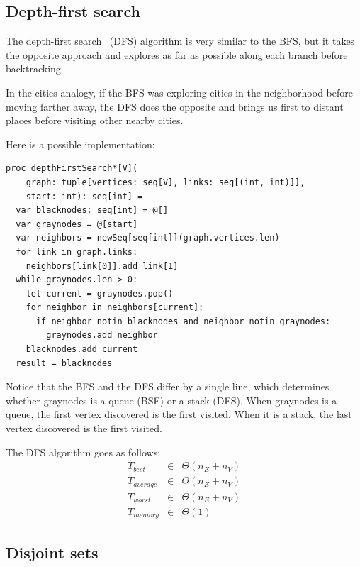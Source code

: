 \documentclass[justified, sixbynine]{tufte-book}
\def\ft{\small\tt}
\theoremstyle{plain}%
\newtheorem * {corollary}{Corollary}
\theoremstyle{definition}
\theoremstyle{remark}
\newtheorem * {remark}{Remark}
\newtheorem * {note}{Note}
\begin{document}
\begin{fullwidth}
\subsection{Depth-first search}


The depth-first search~\cite{dfs} (DFS) algorithm is very similar to the BFS, but it takes the opposite approach and explores as far as possible along each branch before backtracking.

In the cities analogy, if the BFS was exploring cities in the neighborhood before moving farther away, the DFS does the opposite and brings us first to distant places before visiting other nearby cities.

Here is a possible implementation:

\begin{lstlisting}[caption={in file: {\ft nlib/graph.nim}}]
proc depthFirstSearch*[V](
    graph: tuple[vertices: seq[V], links: seq[(int, int)]],
    start: int): seq[int] =
  var blacknodes: seq[int] = @[]
  var graynodes = @[start]
  var neighbors = newSeq[seq[int]](graph.vertices.len)
  for link in graph.links:
    neighbors[link[0]].add link[1]
  while graynodes.len > 0:
    let current = graynodes.pop()
    for neighbor in neighbors[current]:
      if neighbor notin blacknodes and neighbor notin graynodes:
        graynodes.add neighbor
    blacknodes.add current
  result = blacknodes
\end{lstlisting}

Notice that the BFS and the DFS differ by a single line, which determines whether graynodes is a queue (BSF) or a stack (DFS). When graynodes is a queue, the first vertex discovered is the first visited. When it is a stack, the last vertex discovered is the first visited.

The DFS algorithm goes as follows:
\begin{eqnarray}
T_{best} &\in &\Theta (n_E+n_V) \\
T_{average} &\in &\Theta (n_E+n_V) \\
T_{worst} &\in &\Theta (n_E+n_V) \\
T_{memory} &\in &\Theta (1)
\end{eqnarray}

\subsection{Disjoint sets}



\end{fullwidth}
\end{document}
